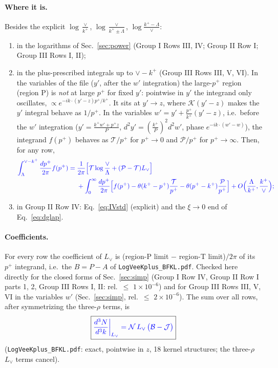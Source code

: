 \documentclass[10pt]{article}
\numberwithin{equation}{section}
\newcommand{\new}[1]{{\color{blue}#1}}
\newcommand{\Lv}{L_{\vee}}
\newcommand{\KK}{\mathcal K}
\newcommand{\JJ}{\mathcal J}
\newcommand{\BB}{\mathcal B}
\newcommand{\NN}{\mathcal N}
\begin{document}
\paragraph{Where it is.} Besides the explicit $\log\frac{\vee}{k^+}$, $\log\frac{\vee}{k^+\pm\Lambda}$, $\log\frac{k^+-\Lambda}{\vee}$:
\begin{enumerate}
\item in the logarithms of Sec.~\ref{sec:power} (Group I Rows III, IV; Group II Row I; Group III Rows I, II);
\item in the plus-prescribed integrals up to $\vee-k^+$ (Group III Rows III, V, VI). In the variables of the file ($y'$, after the $w'$ integration) the large-$p^+$ region (region P) is \emph{not} at large $p^+$ for fixed $y'$: pointwise in $y'$ the integrand only oscillates, $\propto e^{-ik\cdot(y'-z)p^+/k^+}$. It sits at $y'\to z$, where $\KK(y'-z)$ makes the $y'$ integral behave as $1/p^+$. In the variables $w'=y'+\frac{p^+}{k^+}(y'-z)$, i.e.\ before the $w'$ integration ($y'=\frac{k^+w'+p^+z}{P}$, $d^2y'=(\frac{k^+}{P})^2d^2w'$, phase $e^{-ik\cdot(w'-w)}$), the integrand $f(p^+)$ behaves as $\mathcal T/p^+$ for $p^+\to0$ and $\mathcal P/p^+$ for $p^+\to\infty$. Then, for any row,
\begin{equation}
\new{\begin{aligned}\int_\Lambda^{\vee-k^+}\frac{dp^+}{2\pi}f(p^+)={}&\frac{1}{2\pi}\Big[\mathcal T\log\frac{\vee}{\Lambda}+(\mathcal P-\mathcal T)\Lv\Big]\\&+\int_0^{\infty}\frac{dp^+}{2\pi}\Big[f(p^+)-\theta(k^+-p^+)\frac{\mathcal T}{p^+}-\theta(p^+-k^+)\frac{\mathcal P}{p^+}\Big]+O\Big(\frac{\Lambda}{k^+},\frac{k^+}{\vee}\Big);\end{aligned}}
\label{eq:plusrule}
\end{equation}
\item in Group II Row IV: Eq.~\eqref{eq:IVstd} (explicit) and the $\xi\to0$ end of Eq.~\eqref{eq:dglap}.
\end{enumerate}
\paragraph{Coefficients.} For every row the coefficient of $\Lv$ is (region-P limit $-$ region-T limit)$/2\pi$ of its $p^+$ integrand, i.e.\ the $B=P-A$ of \texttt{LogVeeKplus\_BFKL.pdf}. Checked here directly for the closed forms of Sec.~\ref{sec:simp} (Group I Row IV, Group II Row I parts 1, 2, Group III Rows I, II: rel.\ $\le$ $1\times10^{-6}$) and for Group III Rows III, V, VI in the variables $w'$ (Sec.~\ref{sec:simp}, rel.\ $\le$ $2\times10^{-6}$). The sum over all rows, after symmetrizing the three-$\rho$ terms, is
\begin{equation}
\boxed{\new{\frac{d^3N}{d^3k}\bigg|_{\Lv}=\NN\,\Lv\,\big(\BB-\JJ\big)}}
\label{eq:Lv}
\end{equation}
(\texttt{LogVeeKplus\_BFKL.pdf}: exact, pointwise in $z$, 18 kernel structures; the three-$\rho$ $\Lv$ terms cancel).
\end{document}
